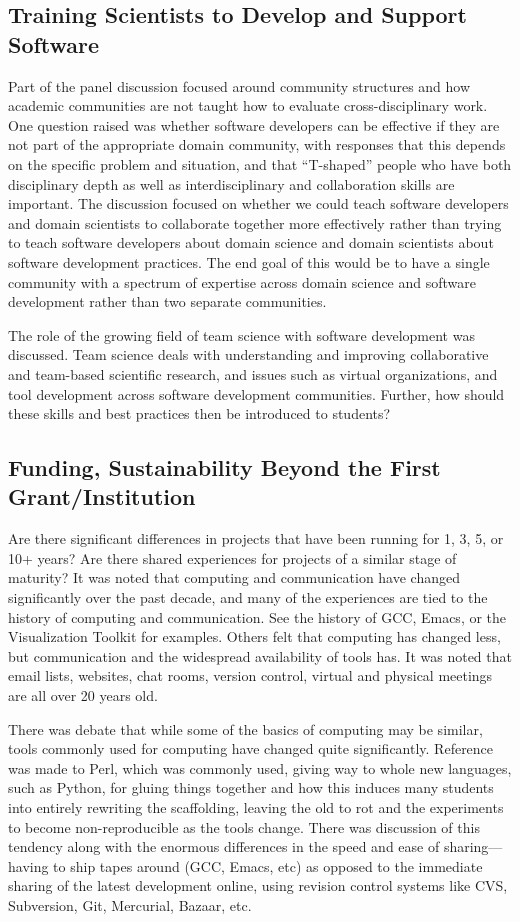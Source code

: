 \documentclass[11pt, oneside]{amsart}
\begin{document}
\subsection{Training Scientists to Develop and Support Software}
Part of the panel discussion focused around community structures and
how academic communities are not taught how to evaluate
cross-disciplinary work.  One question raised was whether software
developers can be effective if they are not part of the appropriate
domain community, with responses that this depends on the specific
problem and situation, and that ``T-shaped'' people who have both
disciplinary depth as well as interdisciplinary and collaboration
skills are important.  The discussion focused on whether we could
teach software developers and domain scientists to collaborate
together more effectively rather than trying to teach software
developers about domain science and domain scientists about software
development practices.  The end goal of this would be to have a single
community with a spectrum of expertise across domain science and
software development rather than two separate communities.

The role of the growing field of team science with software
development was discussed. Team science deals with understanding and
improving collaborative and team-based scientific research, and issues
such as virtual organizations, and tool development across software
development communities. Further, how should these skills and best
practices then be introduced to students?

\subsection{Funding, Sustainability Beyond the First Grant/Institution}

Are there significant differences in projects that have been running
for 1, 3, 5, or 10+ years? Are there shared experiences for projects
of a similar stage of maturity? It was noted that computing and
communication have changed significantly over the past decade, and
many of the experiences are tied to the history of computing and
communication. See the history of GCC, Emacs, or the Visualization
Toolkit for examples. Others felt that computing has changed less, but
communication and the widespread availability of tools has. It was
noted that email lists, websites, chat rooms, version control, virtual
and physical meetings are all over 20 years old.

There was debate that while some of the basics of computing may be
similar, tools commonly used for computing have changed quite
significantly. Reference was made to Perl, which was commonly used,
giving way to whole new languages, such as Python, for gluing things
together and how this induces many students into entirely rewriting
the scaffolding, leaving the old to rot and the experiments to become
non-reproducible as the tools change.  There was discussion of this
tendency along with the enormous differences in the speed and ease of
sharing---having to ship tapes around (GCC, Emacs, etc) as opposed to
the immediate sharing of the latest development online, using revision
control systems like CVS, Subversion, Git, Mercurial, Bazaar, etc.
\end{document}
